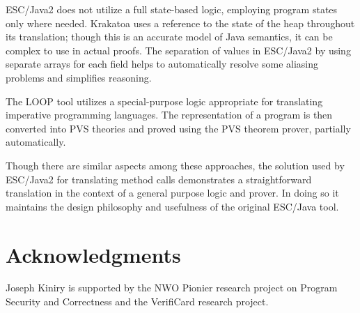 \documentclass{sig-alternate}
\begin{document}
ESC/Java2 does not utilize a full state-based logic, employing program states only where needed.
Krakatoa uses a reference to the state of the heap throughout its translation; though this is an
accurate model of Java semantics, it can be complex to use in actual proofs.  The separation of
values in ESC/Java2 by using separate arrays for each field helps to automatically resolve some
aliasing problems and simplifies reasoning.

The LOOP tool utilizes a special-purpose logic appropriate for translating imperative programming
languages.  The representation of a program is then converted into PVS theories and proved
using the PVS theorem prover, partially automatically.

Though there are similar aspects among these approaches, the solution used by ESC/Java2
for translating method calls demonstrates a straightforward translation in the context of 
a general purpose logic and prover.  In doing so it maintains the design philosophy and usefulness
of the original ESC/Java tool.

\section{Acknowledgments}

Joseph Kiniry is supported by the NWO Pionier research
project on Program Security and Correctness and the VerifiCard
research project. 


%

%

  


%
%



\end{document}
